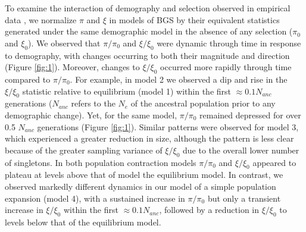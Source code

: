 \documentclass[9pt,twocolumn,twoside]{rilabRxiv}
\begin{document}
To examine the interaction of demography and selection observed in empirical data \citep{beissinger2016recent,torres2018human}, we normalize $\pi$ and $\xi$ in models of BGS by their equivalent statistics generated under the same demographic model in the absence of any selection ($\pi_0$ and $\xi_0$).
We observed that $\pi/\pi_0$ and $\xi/\xi_0$ were dynamic through time in response to demography, with changes occurring to both their magnitude and direction (Figure \ref{fig:1}).
Moreover, changes to $\xi/\xi_0$ occurred more rapidly through time compared to $\pi/\pi_0$.
For example, in model 2 we observed a dip and rise in the $\xi/\xi_0$ statistic relative to equilibrium (model 1) within the first $\approx 0.1N_{anc}$ generations ($N_{anc}$ refers to the $N_e$ of the ancestral population prior to any demographic change).
Yet, for the same model, $\pi/\pi_0$ remained depressed for over 0.5 $N_{anc}$ generations (Figure \ref{fig:1}).
Similar patterns were observed for model 3, which experienced a greater reduction in size, although the pattern is less clear because of the greater sampling variance of $\xi/\xi_0$ due to the overall lower number of singletons.
In both population contraction models  $\pi/\pi_0$ and $\xi/\xi_0$ appeared to plateau at levels above that of model the equilibrium model.
In contrast, we observed markedly different dynamics in our model of a simple population expansion (model 4), with a sustained increase in $\pi/\pi_0$ but only a transient increase in $\xi/\xi_0$ within the first $\approx 0.1N_{anc}$, followed by a reduction in $\xi/\xi_0$ to levels below that of the equilibrium model.
\end{document}
